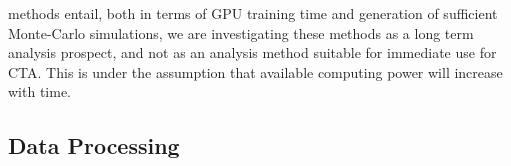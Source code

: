 methods entail, both in terms of GPU training time and generation of sufficient Monte-Carlo simulations, we are investigating these methods as a long term analysis prospect, and not as an analysis method suitable for immediate use for CTA. This is under the assumption that available computing power will increase with time.
\begin{table}[ht]
\centering
{}
\caption{Parameters used in our two datasets. In the point source run, the point source $\gamma$-rays are mixed in equal ratios with the diffuse proton and diffuse electron events. In the diffuse run, all three event classes are diffuse.}
\label{table:Datasetparams}
\end{table}

\subsection{Data Processing}

